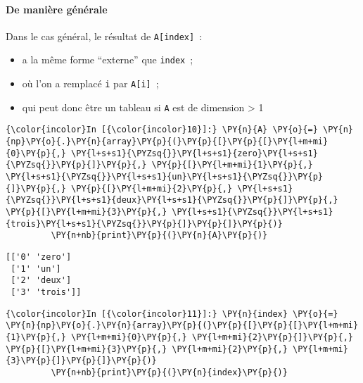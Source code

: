     \hypertarget{de-maniuxe8re-guxe9nuxe9rale}{%
\paragraph{De manière générale}\label{de-maniuxe8re-guxe9nuxe9rale}}

    Dans le cas général, le résultat de \texttt{A{[}index{]}}~:

\begin{itemize}
\tightlist
\item
  a la même forme ``externe'' que \texttt{index}~;
\item
  où l'on a remplacé \texttt{i} par \texttt{A{[}i{]}}~;
\item
  qui peut donc être un tableau si \texttt{A} est de dimension
  \textgreater{} 1
\end{itemize}

    \begin{Verbatim}[commandchars=\\\{\},frame=single,framerule=0.3mm,rulecolor=\color{cellframecolor}]
{\color{incolor}In [{\color{incolor}10}]:} \PY{n}{A} \PY{o}{=} \PY{n}{np}\PY{o}{.}\PY{n}{array}\PY{p}{(}\PY{p}{[}\PY{p}{[}\PY{l+m+mi}{0}\PY{p}{,} \PY{l+s+s1}{\PYZsq{}}\PY{l+s+s1}{zero}\PY{l+s+s1}{\PYZsq{}}\PY{p}{]}\PY{p}{,} \PY{p}{[}\PY{l+m+mi}{1}\PY{p}{,} \PY{l+s+s1}{\PYZsq{}}\PY{l+s+s1}{un}\PY{l+s+s1}{\PYZsq{}}\PY{p}{]}\PY{p}{,} \PY{p}{[}\PY{l+m+mi}{2}\PY{p}{,} \PY{l+s+s1}{\PYZsq{}}\PY{l+s+s1}{deux}\PY{l+s+s1}{\PYZsq{}}\PY{p}{]}\PY{p}{,} \PY{p}{[}\PY{l+m+mi}{3}\PY{p}{,} \PY{l+s+s1}{\PYZsq{}}\PY{l+s+s1}{trois}\PY{l+s+s1}{\PYZsq{}}\PY{p}{]}\PY{p}{]}\PY{p}{)}
         \PY{n+nb}{print}\PY{p}{(}\PY{n}{A}\PY{p}{)}
\end{Verbatim}


    \begin{Verbatim}[commandchars=\\\{\},frame=single,framerule=0.3mm,rulecolor=\color{cellframecolor}]
[['0' 'zero']
 ['1' 'un']
 ['2' 'deux']
 ['3' 'trois']]
\end{Verbatim}

    \begin{Verbatim}[commandchars=\\\{\},frame=single,framerule=0.3mm,rulecolor=\color{cellframecolor}]
{\color{incolor}In [{\color{incolor}11}]:} \PY{n}{index} \PY{o}{=} \PY{n}{np}\PY{o}{.}\PY{n}{array}\PY{p}{(}\PY{p}{[}\PY{p}{[}\PY{l+m+mi}{1}\PY{p}{,} \PY{l+m+mi}{0}\PY{p}{,} \PY{l+m+mi}{2}\PY{p}{]}\PY{p}{,} \PY{p}{[}\PY{l+m+mi}{3}\PY{p}{,} \PY{l+m+mi}{2}\PY{p}{,} \PY{l+m+mi}{3}\PY{p}{]}\PY{p}{]}\PY{p}{)}
         \PY{n+nb}{print}\PY{p}{(}\PY{n}{index}\PY{p}{)}
\end{Verbatim}


